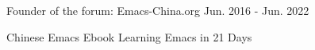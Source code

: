 

\begin{cventries}

  \cventry
    {Founder of the forum: Emacs-China.org} %
    {Jun. 2016 - Jun. 2022} %
    {
      \begin{cvitems} %
        \item {Chinese Emacs Ebook Learning Emacs in 21 Days}
      \end{cvitems}
    }
\end{cventries}
